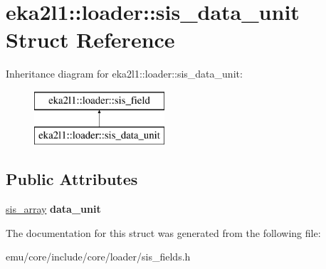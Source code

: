 \hypertarget{structeka2l1_1_1loader_1_1sis__data__unit}{}\section{eka2l1\+:\+:loader\+:\+:sis\+\_\+data\+\_\+unit Struct Reference}
\label{structeka2l1_1_1loader_1_1sis__data__unit}
Inheritance diagram for eka2l1\+:\+:loader\+:\+:sis\+\_\+data\+\_\+unit\+:\begin{figure}[H]
\begin{center}
\leavevmode
\includegraphics[height=2.000000cm]{structeka2l1_1_1loader_1_1sis__data__unit}
\end{center}
\end{figure}
\subsection*{Public Attributes}
\begin{DoxyCompactItemize}
\item 
\mbox{\label{structeka2l1_1_1loader_1_1sis__data__unit_a411ba57869e6f83874b4fafe8ffd8c68}} 
\mbox{\hyperlink{structeka2l1_1_1loader_1_1sis__array}{sis\+\_\+array}} {\bfseries data\+\_\+unit}
\end{DoxyCompactItemize}


The documentation for this struct was generated from the following file\+:\begin{DoxyCompactItemize}
\item 
emu/core/include/core/loader/sis\+\_\+fields.\+h\end{DoxyCompactItemize}
